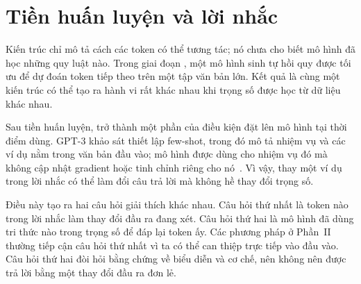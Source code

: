 \section{Tiền huấn luyện và lời nhắc}
\label{sec:ch02-tien-huan-luyen-va-loi-nhac}

%
Kiến trúc chỉ mô tả cách các token có thể tương tác; nó chưa cho biết mô hình
đã học những quy luật nào. Trong giai đoạn ,
một mô hình sinh tự hồi quy được tối ưu để dự đoán token tiếp theo trên một
tập văn bản lớn. Kết quả là cùng một kiến trúc có thể tạo ra hành vi rất khác
nhau khi trọng số được học từ dữ liệu khác nhau.

%
Sau tiền huấn luyện,  trở thành một phần của điều kiện
đặt lên mô hình tại thời điểm dùng. GPT-3 khảo sát thiết lập few-shot, trong
đó mô tả nhiệm vụ và các ví dụ nằm trong văn bản đầu vào; mô hình được dùng
cho nhiệm vụ đó mà không cập nhật gradient hoặc tinh chỉnh riêng cho
nó~\autocite{p03gpt3}. Vì vậy, thay một ví dụ trong lời nhắc có thể làm đổi câu
trả lời mà không hề thay đổi trọng số.

Điều này tạo ra hai câu hỏi giải thích khác nhau. Câu hỏi thứ nhất là token
nào trong lời nhắc làm thay đổi đầu ra đang xét. Câu hỏi thứ hai là mô hình
đã dùng tri thức nào trong trọng số để đáp lại token ấy. Các phương pháp ở
Phần~II thường tiếp cận câu hỏi thứ nhất vì ta có thể can thiệp trực tiếp vào
đầu vào. Câu hỏi thứ hai đòi hỏi bằng chứng về biểu diễn và cơ chế, nên không
nên được trả lời bằng một thay đổi đầu ra đơn lẻ.

